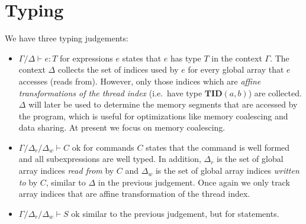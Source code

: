 \documentclass{article}
\newcommand{\of}{\!:\!}
\newcommand{\ok}{\text{ ok}}
\newcommand{\tid}[2]{\textbf{TID}(#1, #2)}
\renewcommand{\|}{\:|\:}
\begin{document}
\section{Typing}
We have three typing judgements: 
\begin{itemize} 
\item ${\Gamma}/{\Delta} {\vdash} e \of T$ for expressions $e$ states that $e$ has type $T$ in the context ${\Gamma}$. The context ${\Delta}$ collects the set of indices used by $e$ for every global array that $e$ accesses (reads from). However, only those indices which are \emph{affine transformations of the thread index} (i.e.\ have type $\tid{a}{b}$) are collected. ${\Delta}$ will later be used to determine the memory segments that are accessed by the program, which is useful for optimizations like memory coalescing and data sharing. At present we focus on memory coalescing.

\item ${\Gamma}/{\Delta}_r/{\Delta}_w {\vdash} C \ok$ for commands $C$ states that the command is well formed and all subexpressions are well typed. In addition, ${\Delta}_r$ is the set of global array indices \emph{read from} by $C$ and ${\Delta}_w$ is the set of global array indices \emph{written to} by $C$, similar to ${\Delta}$ in the previous judgement. Once again we only track array indices that are affine transformation of the thread index.

\item ${\Gamma}/{\Delta}_r/{\Delta}_w {\vdash} S \ok$ similar to the previous judgement, but for statements.
\end{itemize}
\end{document}
